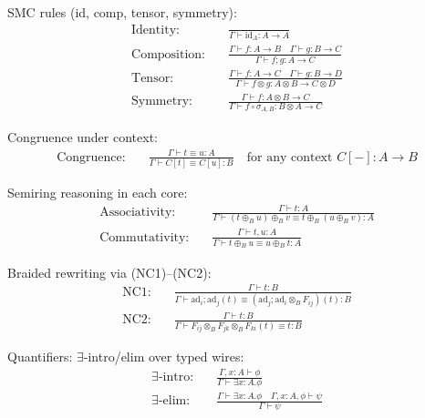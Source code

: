 \begin{definition}
\label{def:inference-rules}
SMC rules (id, comp, tensor, symmetry):
\begin{align}
\text{Identity:} &\quad \frac{}{\Gamma \vdash \text{id}_A : A \to A} \\
\text{Composition:} &\quad \frac{\Gamma \vdash f : A \to B \quad \Gamma \vdash g : B \to C}{\Gamma \vdash f;g : A \to C} \\
\text{Tensor:} &\quad \frac{\Gamma \vdash f : A \to C \quad \Gamma \vdash g : B \to D}{\Gamma \vdash f \otimes g : A \otimes B \to C \otimes D} \\
\text{Symmetry:} &\quad \frac{\Gamma \vdash f : A \otimes B \to C}{\Gamma \vdash f \circ \sigma_{A,B} : B \otimes A \to C}
\end{align}

Congruence under context:
\begin{align}
\text{Congruence:} &\quad \frac{\Gamma \vdash t \equiv u : A}{\Gamma \vdash C[t] \equiv C[u] : B} \quad \text{for any context } C[-] : A \to B
\end{align}

Semiring reasoning in each core:
\begin{align}
\text{Associativity:} &\quad \frac{\Gamma \vdash t : A}{\Gamma \vdash (t \oplus_B u) \oplus_B v \equiv t \oplus_B (u \oplus_B v) : A} \\
\text{Commutativity:} &\quad \frac{\Gamma \vdash t, u : A}{\Gamma \vdash t \oplus_B u \equiv u \oplus_B t : A}
\end{align}

Braided rewriting via (NC1)–(NC2):
\begin{align}
\text{NC1:} &\quad \frac{\Gamma \vdash t : B}{\Gamma \vdash \text{ad}_i; \text{ad}_j(t) \equiv (\text{ad}_j; \text{ad}_i \otimes_B F_{ij})(t) : B} \\
\text{NC2:} &\quad \frac{\Gamma \vdash t : B}{\Gamma \vdash F_{ij} \otimes_B F_{jk} \otimes_B F_{ki}(t) \equiv t : B}
\end{align}

Quantifiers: $\exists$-intro/elim over typed wires:
\begin{align}
\text{$\exists$-intro:} &\quad \frac{\Gamma, x:A \vdash \phi}{\Gamma \vdash \exists x:A. \phi} \\
\text{$\exists$-elim:} &\quad \frac{\Gamma \vdash \exists x:A. \phi \quad \Gamma, x:A, \phi \vdash \psi}{\Gamma \vdash \psi}
\end{align}
\end{definition}

